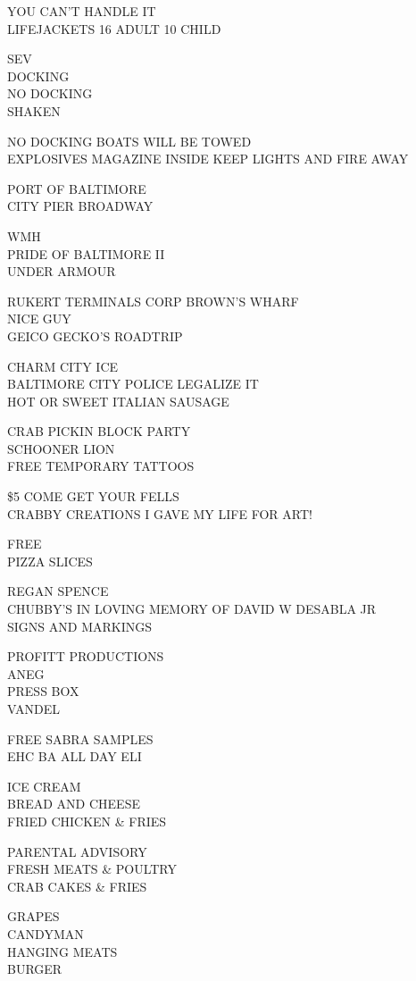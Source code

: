 \documentclass[10pt,letterpaper]{article}
\begin{document}
YOU CAN'T HANDLE IT\\
LIFEJACKETS 16 ADULT 10 CHILD

SEV\\
DOCKING\\
NO DOCKING\\
SHAKEN

NO DOCKING BOATS WILL BE TOWED\\
EXPLOSIVES MAGAZINE INSIDE KEEP LIGHTS AND FIRE AWAY

PORT OF BALTIMORE\\
CITY PIER BROADWAY

WMH\\
PRIDE OF BALTIMORE II\\
UNDER ARMOUR

RUKERT TERMINALS CORP BROWN'S WHARF\\
NICE GUY\\
GEICO GECKO'S ROADTRIP

CHARM CITY ICE\\
BALTIMORE CITY POLICE LEGALIZE IT\\
HOT OR SWEET ITALIAN SAUSAGE

CRAB PICKIN BLOCK PARTY\\
SCHOONER LION\\
FREE TEMPORARY TATTOOS

\$5 COME GET YOUR FELLS\\
CRABBY CREATIONS I GAVE MY LIFE FOR ART!

FREE\\
PIZZA SLICES

REGAN SPENCE\\
CHUBBY'S IN LOVING MEMORY OF DAVID W DESABLA JR\\
SIGNS AND MARKINGS

PROFITT PRODUCTIONS\\
ANEG\\
PRESS BOX\\
VANDEL

FREE SABRA SAMPLES\\
EHC BA ALL DAY ELI

ICE CREAM\\
BREAD AND CHEESE\\
FRIED CHICKEN \& FRIES

PARENTAL ADVISORY\\
FRESH MEATS \& POULTRY\\
CRAB CAKES \& FRIES

GRAPES\\
CANDYMAN\\
HANGING MEATS\\
BURGER
\end{document}
